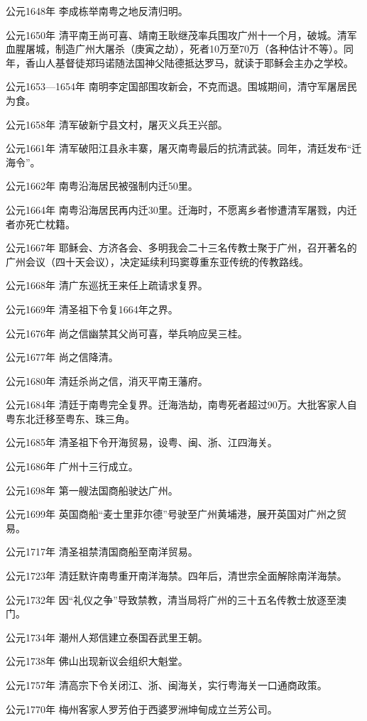 公元1648年 李成栋举南粤之地反清归明。

公元1650年 清平南王尚可喜、靖南王耿继茂率兵围攻广州十一个月，破城。清军血腥屠城，制造广州大屠杀（庚寅之劫），死者10万至70万（各种估计不等）。同年，香山人基督徒郑玛诺随法国神父陆德抵达罗马，就读于耶稣会主办之学校。

公元1653—1654年 南明李定国部围攻新会，不克而退。围城期间，清守军屠居民为食。

公元1658年 清军破新宁县文村，屠灭义兵王兴部。

公元1661年 清军破阳江县永丰寨，屠灭南粤最后的抗清武装。同年，清廷发布“迁海令”。

公元1662年 南粤沿海居民被强制内迁50里。

公元1664年 南粤沿海居民再内迁30里。迁海时，不愿离乡者惨遭清军屠戮，内迁者亦死亡枕籍。

公元1667年 耶稣会、方济各会、多明我会二十三名传教士聚于广州，召开著名的广州会议（四十天会议），决定延续利玛窦尊重东亚传统的传教路线。

公元1668年 清广东巡抚王来任上疏请求复界。

公元1669年 清圣祖下令复1664年之界。

公元1676年 尚之信幽禁其父尚可喜，举兵响应吴三桂。

公元1677年 尚之信降清。

公元1680年 清廷杀尚之信，消灭平南王藩府。

公元1684年 清廷于南粤完全复界。迁海浩劫，南粤死者超过90万。大批客家人自粤东北迁移至粤东、珠三角。

公元1685年 清圣祖下令开海贸易，设粤、闽、浙、江四海关。

公元1686年 广州十三行成立。

公元1698年 第一艘法国商船驶达广州。

公元1699年 英国商船“麦士里菲尔德”号驶至广州黄埔港，展开英国对广州之贸易。

公元1717年 清圣祖禁清国商船至南洋贸易。

公元1723年 清廷默许南粤重开南洋海禁。四年后，清世宗全面解除南洋海禁。

公元1732年 因“礼仪之争”导致禁教，清当局将广州的三十五名传教士放逐至澳门。

公元1734年 潮州人郑信建立泰国吞武里王朝。

公元1738年 佛山出现新议会组织大魁堂。

公元1757年 清高宗下令关闭江、浙、闽海关，实行粤海关一口通商政策。

公元1770年 梅州客家人罗芳伯于西婆罗洲坤甸成立兰芳公司。

